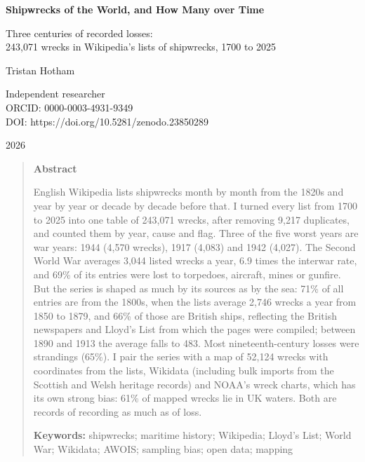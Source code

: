 \documentclass[11pt,a4paper]{article}
\begin{document}
\begin{center}
{\Large\bfseries Shipwrecks of the World, and How Many over Time\par}
\vspace{0.4em}
{\large Three centuries of recorded losses:\\243,071 wrecks in Wikipedia's lists of shipwrecks, 1700 to 2025\par}
\vspace{1.2em}
{\large Tristan Hotham\par}
\vspace{0.3em}
{\small Independent researcher\\
ORCID: 0000-0003-4931-9349\\
DOI: https://doi.org/10.5281/zenodo.23850289\par}
\vspace{0.8em}
2026
\end{center}

\begin{quote}
\small
\begin{center}\textbf{Abstract}\end{center}
English Wikipedia lists shipwrecks month by month from the 1820s and year by year or decade by decade before that. I turned every list from 1700 to 2025 into one table of 243,071 wrecks, after removing 9,217 duplicates, and counted them by year, cause and flag. Three of the five worst years are war years: 1944 (4,570 wrecks), 1917 (4,083) and 1942 (4,027). The Second World War averages 3,044 listed wrecks a year, 6.9 times the interwar rate, and 69\% of its entries were lost to torpedoes, aircraft, mines or gunfire. But the series is shaped as much by its sources as by the sea: 71\% of all entries are from the 1800s, when the lists average 2,746 wrecks a year from 1850 to 1879, and 66\% of those are British ships, reflecting the British newspapers and Lloyd's List from which the pages were compiled; between 1890 and 1913 the average falls to 483. Most nineteenth-century losses were strandings (65\%). I pair the series with a map of 52,124 wrecks with coordinates from the lists, Wikidata (including bulk imports from the Scottish and Welsh heritage records) and NOAA's wreck charts, which has its own strong bias: 61\% of mapped wrecks lie in UK waters. Both are records of recording as much as of loss.

\textbf{Keywords:} shipwrecks; maritime history; Wikipedia; Lloyd's List; World War; Wikidata; AWOIS; sampling bias; open data; mapping
\end{quote}
\end{document}
